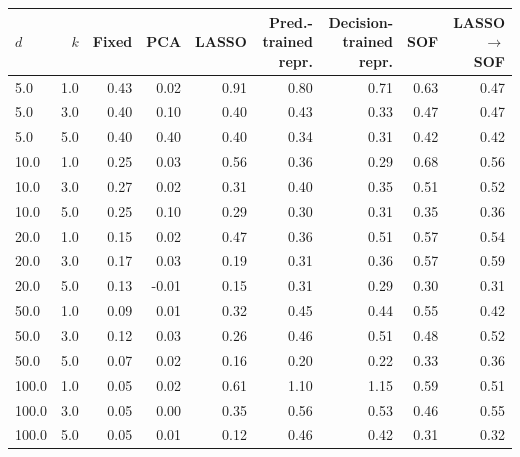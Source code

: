 \begin{tabular}{lrrrrrrrr}
\toprule
$d$ & $k$ & Fixed & PCA & LASSO & Pred.-trained repr. & Decision-trained repr. & SOF & LASSO$\to$SOF \\
\midrule
5.0 & 1.0 & 0.43 & 0.02 & 0.91 & 0.80 & 0.71 & 0.63 & 0.47 \\
5.0 & 3.0 & 0.40 & 0.10 & 0.40 & 0.43 & 0.33 & 0.47 & 0.47 \\
5.0 & 5.0 & 0.40 & 0.40 & 0.40 & 0.34 & 0.31 & 0.42 & 0.42 \\
10.0 & 1.0 & 0.25 & 0.03 & 0.56 & 0.36 & 0.29 & 0.68 & 0.56 \\
10.0 & 3.0 & 0.27 & 0.02 & 0.31 & 0.40 & 0.35 & 0.51 & 0.52 \\
10.0 & 5.0 & 0.25 & 0.10 & 0.29 & 0.30 & 0.31 & 0.35 & 0.36 \\
20.0 & 1.0 & 0.15 & 0.02 & 0.47 & 0.36 & 0.51 & 0.57 & 0.54 \\
20.0 & 3.0 & 0.17 & 0.03 & 0.19 & 0.31 & 0.36 & 0.57 & 0.59 \\
20.0 & 5.0 & 0.13 & -0.01 & 0.15 & 0.31 & 0.29 & 0.30 & 0.31 \\
50.0 & 1.0 & 0.09 & 0.01 & 0.32 & 0.45 & 0.44 & 0.55 & 0.42 \\
50.0 & 3.0 & 0.12 & 0.03 & 0.26 & 0.46 & 0.51 & 0.48 & 0.52 \\
50.0 & 5.0 & 0.07 & 0.02 & 0.16 & 0.20 & 0.22 & 0.33 & 0.36 \\
100.0 & 1.0 & 0.05 & 0.02 & 0.61 & 1.10 & 1.15 & 0.59 & 0.51 \\
100.0 & 3.0 & 0.05 & 0.00 & 0.35 & 0.56 & 0.53 & 0.46 & 0.55 \\
100.0 & 5.0 & 0.05 & 0.01 & 0.12 & 0.46 & 0.42 & 0.31 & 0.32 \\
\bottomrule
\end{tabular}
